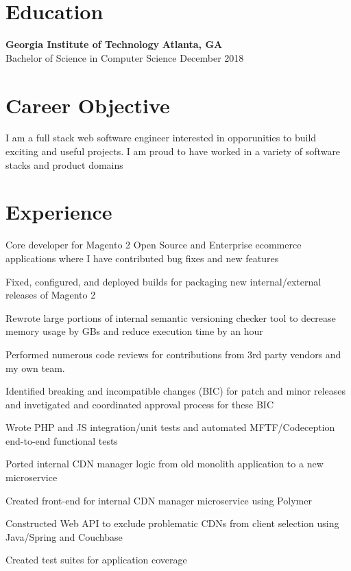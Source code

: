 \documentclass[line]{resume}
\begin{document}
\begin{center}
\end{center}
\section{Education}
\textbf{Georgia Institute of Technology} \hfill \textbf{Atlanta, GA} \\
Bachelor of Science in Computer Science  \hfill December 2018
\section{Career Objective}
I am a full stack web software engineer interested in opporunities to build exciting and useful projects. I am proud to have worked in a variety of software stacks and product domains \\
\section{Experience}
\begin{myitemize}
	\item Core developer for Magento 2 Open Source and Enterprise ecommerce applications where I have contributed bug fixes and new features
	\item Fixed, configured, and deployed builds for packaging new internal/external releases of Magento 2
	\item Rewrote large portions of internal semantic versioning checker tool to decrease memory usage by GBs and reduce execution time by an hour
	\item Performed numerous code reviews for contributions from 3rd party vendors and my own team.
	\item Identified breaking and incompatible changes (BIC) for patch and minor releases and invetigated and coordinated approval process for these BIC
	\item Wrote PHP and JS integration/unit tests and automated MFTF/Codeception end-to-end functional tests
\end{myitemize}
\begin{myitemize}
	\item Ported internal CDN manager logic from old monolith application to a new microservice
	\item Created front-end for internal CDN manager microservice using Polymer
	\item Constructed Web API to exclude problematic CDNs from client selection using Java/Spring and Couchbase
	\item Created test suites for application coverage
\end{myitemize}
\end{document}
